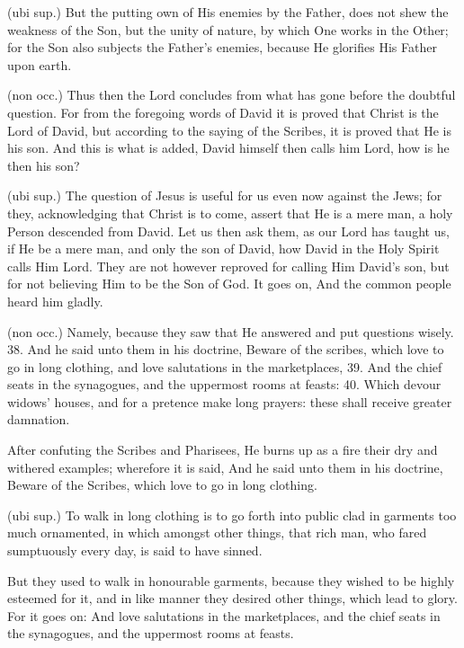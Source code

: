  (ubi sup.) But the putting own of His enemies by the Father, does not shew the weakness of the Son, but the unity of nature, by which One works in the Other; for the Son also subjects the Father’s enemies, because He glorifies His Father upon earth.

 (non occ.) Thus then the Lord concludes from what has gone before the doubtful question. For from the foregoing words of David it is proved that Christ is the Lord of David, but according to the saying of the Scribes, it is proved that He is his son. And this is what is added, David himself then calls him Lord, how is he then his son?

 (ubi sup.) The question of Jesus is useful for us even now against the Jews; for they, acknowledging that Christ is to come, assert that He is a mere man, a holy Person descended from David. Let us then ask them, as our Lord has taught us, if He be a mere man, and only the son of David, how David in the Holy Spirit calls Him Lord. They are not however reproved for calling Him David’s son, but for not believing Him to be the Son of God. It goes on, And the common people heard him gladly.

 (non occ.) Namely, because they saw that He answered and put questions wisely. 38. And he said unto them in his doctrine, Beware of the scribes, which love to go in long clothing, and love salutations in the marketplaces, 39. And the chief seats in the synagogues, and the uppermost rooms at feasts: 40. Which devour widows’ houses, and for a pretence make long prayers: these shall receive greater damnation.

 After confuting the Scribes and Pharisees, He burns up as a fire their dry and withered examples; wherefore it is said, And he said unto them in his doctrine, Beware of the Scribes, which love to go in long clothing.

 (ubi sup.) To walk in long clothing is to go forth into public clad in garments too much ornamented, in which amongst other things, that rich man, who fared sumptuously every day, is said to have sinned.

 But they used to walk in honourable garments, because they wished to be highly esteemed for it, and in like manner they desired other things, which lead to glory. For it goes on: And love salutations in the marketplaces, and the chief seats in the synagogues, and the uppermost rooms at feasts.

